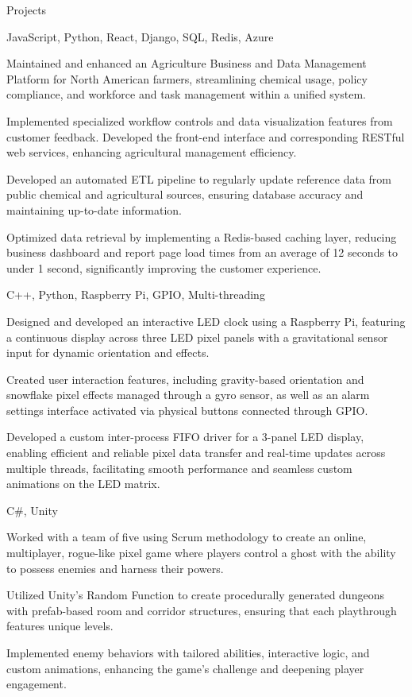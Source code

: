\documentclass[10pt]{article}
\begin{document}
\begin{customsection}{Projects}

    {JavaScript, Python, React, Django, SQL, Redis, Azure}
    {
        \item Maintained and enhanced an Agriculture Business and Data Management Platform for North American farmers, streamlining chemical usage, policy compliance, and workforce and task management within a unified system.
        \item Implemented specialized workflow controls and data visualization features from customer feedback. Developed the front-end interface and corresponding RESTful web services, enhancing agricultural management efficiency.
        \item Developed an automated ETL pipeline to regularly update reference data from public chemical and agricultural sources, ensuring database accuracy and maintaining up-to-date information.
        \item Optimized data retrieval by implementing a Redis-based caching layer, reducing business dashboard and report page load times from an average of 12 seconds to under 1 second, significantly improving the customer experience.
    }

    {C++, Python, Raspberry Pi, GPIO, Multi-threading}
    {
        \item Designed and developed an interactive LED clock using a Raspberry Pi, featuring a continuous display across three LED pixel panels with a gravitational sensor input for dynamic orientation and effects.
        \item Created user interaction features, including gravity-based orientation and snowflake pixel effects managed through a gyro sensor, as well as an alarm settings interface activated via physical buttons connected through GPIO.
        \item Developed a custom inter-process FIFO driver for a 3-panel LED display, enabling efficient and reliable pixel data transfer and real-time updates across multiple threads, facilitating smooth performance and seamless custom animations on the LED matrix.
    }

    {C\#, Unity}
    {
        \item Worked with a team of five using Scrum methodology to create an online, multiplayer, rogue-like pixel game where players control a ghost with the ability to possess enemies and harness their powers.
        \item Utilized Unity’s Random Function to create procedurally generated dungeons with prefab-based room and corridor structures, ensuring that each playthrough features unique levels. 
        \item Implemented enemy behaviors with tailored abilities, interactive logic, and custom animations, enhancing the game's challenge and deepening player engagement.
    }


\end{customsection}
\end{document}
